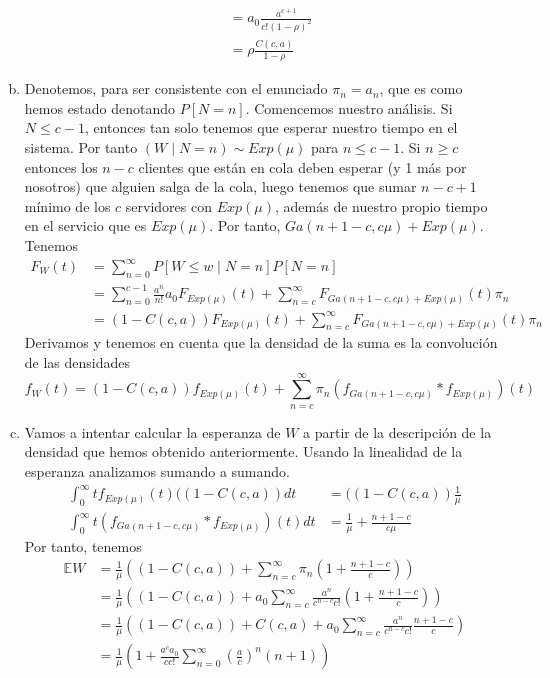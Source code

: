 \documentclass[twoside]{article}
\begin{document}
\begin{solucion}
\begin{enumerate}[(a)]
\begin{align*}
&= a_0\frac{a^{c+1}}{c!(1-\rho)^2} \\
&= \rho\frac{C(c,a)}{1-\rho}
\end{align*}
\item Denotemos, para ser consistente con el enunciado $\pi_n = a_n$, que es como hemos estado denotando $P[N=n]$. Comencemos nuestro análisis. Si $N\leq c-1$, entonces tan solo tenemos que esperar nuestro tiempo en el sistema. Por tanto $(W\mid N = n) \sim Exp(\mu)$ para $n\leq c-1$. Si $n\geq c$ entonces los $n-c$ clientes que están en cola deben esperar (y 1 más por nosotros) que alguien salga de la cola, luego tenemos que sumar $n-c+1$ mínimo de los $c$ servidores con $Exp(\mu)$, además de nuestro propio tiempo en el servicio que es $Exp(\mu)$. Por tanto, $Ga(n+1-c,c\mu) + Exp(\mu)$. Tenemos
\begin{align*}
F_W(t) &= \sum_{n=0}^\infty P[W\leq w\mid N=n]P[N=n]\\
&=\sum_{n=0}^{c-1} \frac{a^n}{n!}a_0 F_{Exp(\mu)}(t) + \sum_{n=c}^\infty F_{Ga(n+1-c,c\mu)+Exp(\mu)}(t) \pi_n \\
&= (1-C(c,a))F_{Exp(\mu)}(t) +\sum_{n=c}^\infty F_{Ga(n+1-c,c\mu)+Exp(\mu)}(t) \pi_n 
\end{align*}
Derivamos y tenemos en cuenta que la densidad de la suma es la convolución de las densidades
$$
f_W(t) = (1-C(c,a))f_{Exp(\mu)}(t) + \sum_{n=c}^\infty \pi_n (f_{Ga(n+1-c,c\mu)}\ast f_{Exp(\mu)})(t)
$$
\item Vamos a intentar calcular la esperanza de $W$ a partir de la descripción de la densidad que hemos obtenido anteriormente. Usando la linealidad de la esperanza analizamos sumando a sumando. 
\begin{align*}
\int_0^\infty t f_{Exp(\mu)}(t)((1-C(c,a))dt & = ((1-C(c,a))\frac{1}{\mu} \\
\int_0^\infty t(f_{Ga(n+1-c,c\mu)}\ast f_{Exp(\mu)})(t)dt &= \frac{1}{\mu} + \frac{n+1-c}{c\mu}
\end{align*}
Por tanto, tenemos
\begin{align*}
\mathbb{E}W &= \frac{1}{\mu}\left( (1-C(c,a)) + \sum_{n=c}^\infty \pi_n \left(1+\frac{n+1-c}{c}\right)\right)\\
&=\frac{1}{\mu}\left( (1-C(c,a)) + a_0\sum_{n=c}^\infty \frac{a^n}{c^{n-c}c!}\left(1+\frac{n+1-c}{c}\right)\right)\\
&=\frac{1}{\mu}\left( (1-C(c,a))+ {C(c,a)} + a_0\sum_{n=c}^\infty \frac{a^n}{c^{n-c}c!}\frac{n+1-c}{c}\right)\\
&=\frac{1}{\mu}\left( 1 + \frac{a^c a_0}{cc!}\sum_{n=0}^\infty \left(\frac{a}{c}\right)^n (n+1)\right)\\

\end{align*}
\end{enumerate}
\end{solucion}
\end{document}
